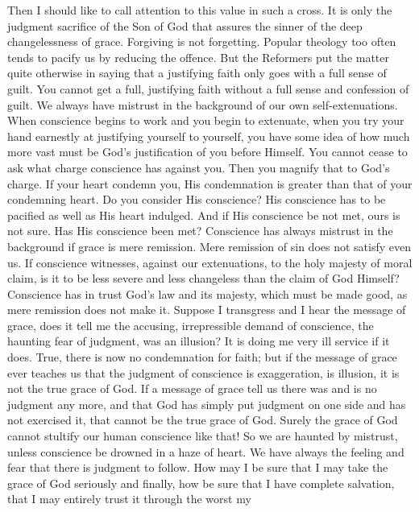 \documentclass[draft]{ptfdoc}
\begin{document}
Then I should like to call attention to this 
value in such a cross. It is only the judgment 
sacrifice of the Son of God that assures the 
sinner of the deep changelessness of grace. 
Forgiving is not forgetting. Popular theology 
too often tends to pacify us by reducing the 
offence. But the Reformers put the matter quite 
otherwise in saying that a justifying faith only 
goes with a full sense of guilt. You cannot get 
a full, justifying faith without a full sense and 
confession of guilt. We always have mistrust 
in the background of our own self-extenuations. 
When conscience begins to work and you begin 
to extenuate, when you try your hand earnestly 
at justifying yourself to yourself, you have some 
idea of how much more vast must be God's 
justification of you before Himself. You cannot 
cease to ask what charge conscience has 
against you. Then you magnify that to God's 
charge. If your heart condemn you, His condemnation 
is greater than that of your condemning 
heart. Do you consider His conscience? 
His conscience has to be pacified as well as His 
heart indulged. And if His conscience be not 
met, ours is not sure. Has His conscience been 
met? Conscience has always mistrust in the 
background if grace is mere remission. Mere 
remission of sin does not satisfy even us. If 
conscience witnesses, against our extenuations, 
to the holy majesty of moral claim, is it to 
be less severe and less changeless than the 
claim of God Himself? Conscience has in trust 
God's law and its majesty, which must be made 
good, as mere remission does not make it. Suppose 
I transgress and I hear the message of 
grace, does it tell me the accusing, irrepressible 
demand of conscience, the haunting fear of 
judgment, was an illusion? It is doing me 
very ill service if it does. True, there is now 
no condemnation for faith; but if the message 
of grace ever teaches us that the judgment of 
conscience is exaggeration, is illusion, it is not 
the true grace of God. If a message of grace 
tell us there was and is no judgment any more, 
and that God has simply put judgment on 
one side and has not exercised it, that cannot 
be the true grace of God. Surely the grace of 
God cannot stultify our human conscience like 
that! So we are haunted by mistrust, unless 
conscience be drowned in a haze of heart. We 
have always the feeling and fear that there is 
judgment to follow. How may I be sure that I 
may take the grace of God seriously and finally, 
how be sure that I have complete salvation, that 
I may entirely trust it through the worst my 
\end{document}
